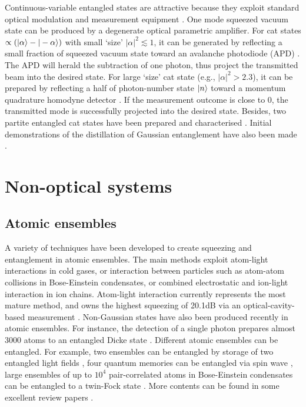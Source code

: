 Continuous-variable entangled states are attractive because they exploit standard optical modulation and measurement equipment \cite{bib:ralph2009bright}. One mode squeezed vacuum state can be produced by a degenerate optical parametric amplifier. For cat states \mbox{$\propto(|\alpha\rangle - |-\alpha\rangle)$} with small `size' \mbox{$|\alpha|^2 \lesssim 1$}, it can be generated by reflecting a small fraction of squeezed vacuum state toward an avalanche photodiode (APD) \cite{bib:neergaard2006generation, bib:ourjoumtsev2006generating, bib:wakui2007photon}. The APD will herald the subtraction of one photon, thus project the transmitted beam into the desired state. For large `size' cat state (e.g., \mbox{$|\alpha|^2 > 2.3$}), it can be prepared by reflecting a half of photon-number state $|n\rangle$ toward a momentum quadrature homodyne detector \cite{bib:ourjoumtsev2007generation, bib:takahashi2008generation}. If the measurement outcome is close to 0, the transmitted mode is successfully projected into the desired state. Besides, two partite entangled cat states have been prepared and characterised \cite{bib:ourjoumtsev2009preparation}. Initial demonstrations of the distillation of Gaussian entanglement have also been made \cite{bib:takahashi2010entanglement, bib:xiang2010heralded}.

%
%

\section{Non-optical systems} 

%
%

\subsection{Atomic ensembles} 

A variety of techniques have been developed to create squeezing and entanglement in atomic ensembles. The main methods exploit atom-light interactions in cold gases, or interaction between particles such as atom-atom collisions in Bose-Einstein condensates, or combined electrostatic and ion-light interaction in ion chains. Atom-light interaction currently represents the most mature method, and owns the highest squeezing of 20.1dB via an optical-cavity-based measurement \cite{bib:hosten2016measurement}. Non-Gaussian states have also been produced recently in atomic ensembles. For instance, the detection of a single photon prepares almost 3000 atoms to an entangled Dicke state \cite{bib:mcconnell2015entanglement}. Different atomic ensembles can be entangled. For example, two ensembles can be entangled by storage of two entangled light fields \cite{bib:lukin2000entanglement}, four quantum memories can be entangled via spin wave \cite{bib:choi2010entanglement}, large ensembles of up to $10^4$ pair-correlated atoms in Bose-Einstein condensates can be entangled to a twin-Fock state \cite{bib:lucke2011twin}. More contents can be found in some excellent review papers \cite{bib:kimble2008quantum, bib:hammerer2010quantum, bib:sangouard2011quantum, bib:pezze2016non}.

